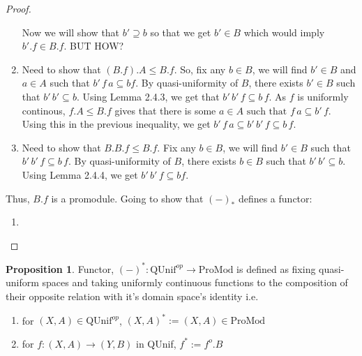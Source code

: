 \documentclass[18pt,a4paper]{article}
\theoremstyle{definition}
\newtheorem{proop}{Proposition}[section]
\begin{document}
\begin{proof}
\begin{enumerate}[label=(\roman*)]
			Now we will show that $b'\supseteq b$ so that we get $b' \in B$ which
			would imply $b'.f \in B.f$. BUT HOW?
		\item Need to show that $(B.f).A \leq B.f$. So, fix any $b\in B$, we will find
			$b' \in B$ and $a\in A$ such that $b' \, f\,a \subseteq bf$.
			By quasi-uniformity of $B$, there exists $b' \in B$ such that $b'\,b'
			\subseteq b$. Using Lemma 2.4.3, we get that $b'\,b'\,f \subseteq b\,f$.
			As $f$ is uniformly continous, $f.A \leq B.f$ gives that there is some
			$a \in A \text{ such that } f\,a \subseteq b'\,f$. Using this in the
			previous inequality, we get $b'\,f\,a \subseteq b'\,b'\,f\subseteq  b\,f$.
		\item Need to show that $B.B.f \leq B.f$. Fix any $b \in B$, we will find
			$b' \in B$ such that $b'\,b'\,f \subseteq b\,f$.
			By quasi-uniformity of $B$, there exists $b \in B$ such that
			$b'\,b' \subseteq  b$. Using Lemma 2.4.4, we get $b'\,b'\,f \subseteq bf$.
	\end{enumerate}
	Thus, $B.f$ is a promodule. Going to show that $(-)_*$ defines a functor:
	\begin{enumerate}[label=(\roman*)]
		\item
	\end{enumerate}
\end{proof}
\newpage
\begin{proop} Functor, $(-)^*:\text{QUnif}^{op} \to \text{ProMod}$ is
	defined as fixing quasi-uniform spaces and taking
	uniformly continuous functions to the composition of their opposite
	relation with it's domain space's identity i.e.
	\begin{enumerate}[label=(\alph*)]
		\item for $(X,A) \in \text{QUnif}^{op}$, $(X,A)^*:=(X,A) \in \text{ProMod}$
		\item for $f:(X,A) \to (Y,B)$ in QUnif,
			$f^* := f^o .B$
	\end{enumerate}
\end{proop}
\end{document}
